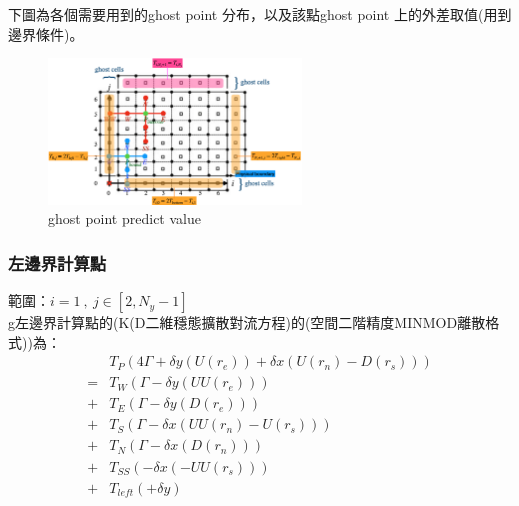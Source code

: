 \documentclass[12pt]{article}
\begin{document}
下圖為各個需要用到的ghost point 分布，以及該點ghost point 上的外差取值(用到邊界條件)。
\begin{figure}[H]
    \centering
    \includegraphics[width=0.6\textwidth]{38.png}
    \caption{\footnotesize ghost point predict value}
    \label{fig:ghost point predict value}
\end{figure}
\subsubsection{左邊界計算點}
\noindent 範圍：$i = 1\ ,\ j\in [2,N_{y}-1]$\\[1.5ex]
\noindent g左邊界計算點的(K(D二維穩態擴散對流方程)的(空間二階精度MINMOD離散格式))為：
\begin{equation}\begin{split}
&T_{P}(4\Gamma + \delta y(U(r_e)) + \delta x(U(r_n) - D(r_s)))\\[1.5ex]
=&T_{W}(\Gamma - \delta y(UU(r_e)))\\[1.5ex]
+&T_{E}(\Gamma - \delta y(D(r_e)) )\\[1.5ex]
+&T_{S}(\Gamma - \delta x(UU(r_n)-U(r_s)))\\[1.5ex]
+&T_{N}(\Gamma - \delta x(D(r_n)))\\[1.5ex]
+&T_{SS}(- \delta x(-UU(r_s)))\\[1.5ex]
+&T_{left}(+ \delta y)\\[1.5ex]
\end{split}\end{equation}
\end{document}
